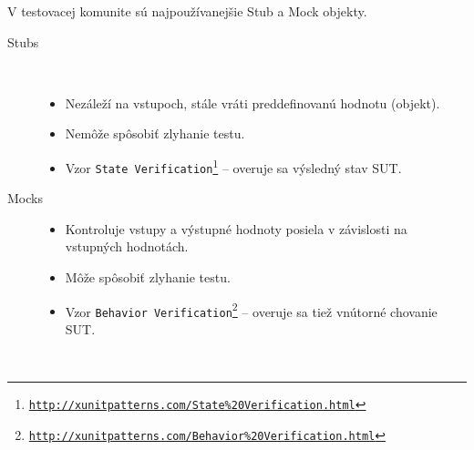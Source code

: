 V testovacej komunite sú najpoužívanejšie Stub a Mock objekty.
\begin{description}
	\item[Stubs]\
		\label{stub}
		\begin{itemize}
			\item Nezáleží na vstupoch, stále vráti preddefinovanú hodnotu (objekt).
			\item Nemôže spôsobiť zlyhanie testu.
			\item Vzor \texttt{State Verification\footnote{\url{http://xunitpatterns.com/State\%20Verification.html}}} -- overuje sa výsledný stav SUT.
		\end{itemize}
	\item[Mocks]
		\label{mock}
		\begin{itemize}
			\item Kontroluje vstupy a výstupné hodnoty posiela v závislosti na vstupných hodnotách.
			\item Môže spôsobiť zlyhanie testu.
			\item Vzor \texttt{Behavior Verification\footnote{\url{http://xunitpatterns.com/Behavior\%20Verification.html}}} -- overuje sa tiež vnútorné chovanie SUT.
		\end{itemize}
\end{description}
 \\
